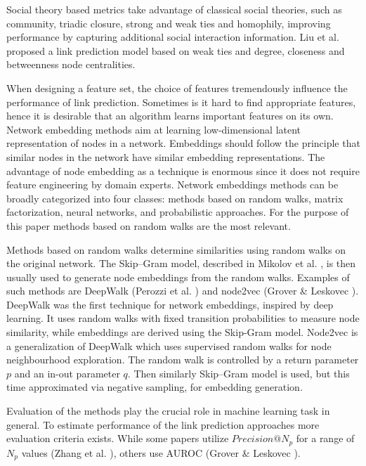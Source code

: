 \documentclass[9pt,twocolumn,twoside]{pnas-new}
\begin{document}
Social theory based metrics take advantage of classical social theories, such as community, triadic closure, strong and weak ties and homophily, improving performance by capturing additional social interaction information. Liu et al. \cite{Liu2013} proposed a link prediction model based on weak ties and degree, closeness and betweenness node centralities.


When designing a feature set, the choice of features tremendously influence the performance of link prediction. Sometimes is it hard to find appropriate features, hence it is desirable that an algorithm learns important features on its own. Network embedding methods aim at learning low-dimensional latent representation of nodes in a network. Embeddings should follow the principle that similar nodes in the network have similar embedding representations. The advantage of node embedding as a technique is enormous since it does not require feature engineering by domain experts. Network embeddings methods can be broadly categorized into four classes: methods based on random walks, matrix factorization, neural networks, and probabilistic approaches. For the purpose of this paper methods based on random walks are the most relevant. 

Methods based on random walks determine similarities using random walks on the original network. The Skip--Gram model, described in Mikolov et al. \cite{Mikolov2013}, is then usually used to generate node embeddings from the random walks. Examples of such methods are DeepWalk (Perozzi et al. \cite{Perozzi2014}) and node2vec (Grover \& Leskovec \cite{Grover2016}). DeepWalk was the first technique for network embeddings, inspired by deep learning. It uses random walks with fixed transition probabilities to measure node similarity, while embeddings are derived using the Skip-Gram model. Node2vec is a generalization of DeepWalk which uses supervised random walks for node neighbourhood exploration. The random walk is controlled by a return parameter $p$ and an in-out parameter $q$. Then similarly Skip--Gram model is used, but this time approximated via negative sampling, for embedding generation. 

Evaluation of the methods play the crucial role in machine learning task in general. To estimate performance of the link prediction approaches more evaluation criteria exists. While some papers utilize $Precision@N_p$ for a range of $N_p$ values (Zhang et al. \cite{Zhang2018}), others use AUROC (Grover \& Leskovec \cite{Grover2016}).
 
\end{document}
